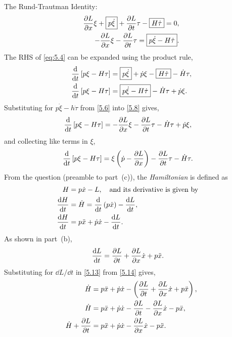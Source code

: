 The Rund-Trautman Identity:
\begin{align}
\label{5.5}
	\frac{\partial L}{\partial x}\xi +  \boxed{p\dot{\xi}} + \frac{\partial L}{\partial t}\tau - \boxed{H\dot{\tau}}=0,\\
\label{5.6}
	-\frac{\partial L}{\partial x}\xi - \frac{\partial L}{\partial t}\tau = \boxed{p\dot{\xi}  - H\dot{\tau}}.
\end{align}
The RHS of \eqref{eq:5.4} can be expanded using the product rule,
\begin{align}
\label{5.7}
	\frac{\mathrm{d}}{\mathrm{d}t}\left[p\xi-H\tau\right] &= \boxed{p\dot{\xi}} +\dot{p}\xi - \boxed{H\dot{\tau}} - \dot{H}\tau,\\
\label{5.8}
	\frac{\mathrm{d}}{\mathrm{d}t}\left[p\xi-H\tau\right] &= \boxed{p\dot{\xi} - H\dot{\tau}} - \dot{H}\tau +\dot{p}\xi.
\end{align}
Substituting for $\boxed{p\dot{\xi} - h\dot{\tau}}$ from \eqref{5.6} into \eqref{5.8} gives,
\begin{align}
\label{5.9}
	\frac{\mathrm{d}}{\mathrm{d}t}\left[p\xi-H\tau\right]&= -\frac{\partial L}{\partial x}\xi - \frac{\partial L}{\partial t}\tau  - \dot{H}\tau +\dot{p}\xi,
\end{align}
and collecting like terms in $\xi$,
\begin{align}
\label{5.10}
	\frac{\mathrm{d}}{\mathrm{d}t}\left[p\xi-H\tau\right]&=  \xi\left(\dot{p} -\frac{\partial L}{\partial x}\right) - \frac{\partial L}{\partial t}\tau  - \dot{H}\tau.
\end{align}
From the question (preamble to part~(c)), the \textit{Hamiltonian} is defined as
\begin{align}
\label{5.11}
	H &= p\dot{x} - L,\quad\text{and its derivative is given by}\quad\\
\label{5.12}
	\frac{\mathrm{d}H	}{\mathrm{d}t} &= \dot{H} = \frac{\mathrm{d}}{\mathrm{d}t}\left(p\dot{x}\right)-\frac{\mathrm{d}L}{\mathrm{d}t},\\
\label{5.13}
	\frac{\mathrm{d}H	}{\mathrm{d}t} &= p\ddot{x} +\dot{p}\dot{x} -\frac{\mathrm{d}L}{\mathrm{d}t}.
\end{align}
As shown in part~(b),
\begin{align}
\label{5.14}
\frac{\mathrm{d}L}{\mathrm{d}t} &= \frac{\partial L}{\partial t}+\frac{\partial L}{\partial x}\dot{x} + p\ddot{x}.
\end{align}
Substituting for $\dd L/\dd t$ in \eqref{5.13} from \eqref{5.14} gives,
\begin{align}
\label{5.15}
	\dot{H} &= p\ddot{x} +\dot{p}\dot{x} -\left(\frac{\partial L}{\partial t}+\frac{\partial L}{\partial x}\dot{x} + p\ddot{x}\right),\\
\label{5.16}
	\dot{H}  &= p\ddot{x} +\dot{p}\dot{x} -\frac{\partial L}{\partial t}-\frac{\partial L}{\partial x}\dot{x} - p\ddot{x},\\
\label{5.17}
	\dot{H} + \frac{\partial L}{\partial t} &= p\ddot{x} +\dot{p}\dot{x} -\frac{\partial L}{\partial x}\dot{x} - p\ddot{x}.
\end{align}
